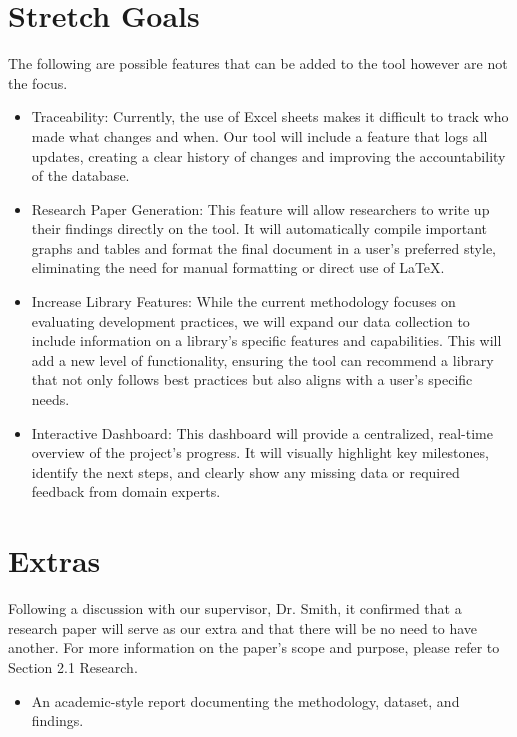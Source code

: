 \documentclass{article}
\begin{document}
\section{Stretch Goals}
The following are possible features that can be added to the tool however are not the focus.
\begin{itemize}
    \item Traceability: Currently, the use of Excel sheets makes it difficult to track who made what changes and when. Our tool will include a feature that logs all updates, creating a clear history of changes and improving the accountability of the database.
    \item Research Paper Generation: This feature will allow researchers to write up their findings directly on the tool. It will automatically compile important graphs and tables and format the final document in a user's preferred style, eliminating the need for manual formatting or direct use of LaTeX.
    \item Increase Library Features: While the current methodology focuses on evaluating development practices, we will expand our data collection to include information on a library's specific features and capabilities. This will add a new level of functionality, ensuring the tool can recommend a library that not only follows best practices but also aligns with a user's specific needs.
    \item Interactive Dashboard: This dashboard will provide a centralized, real-time overview of the project's progress. It will visually highlight key milestones, identify the next steps, and clearly show any missing data or required feedback from domain experts.
\end{itemize}
\section{Extras}
Following a discussion with our supervisor, Dr. Smith, it confirmed that a research paper will serve as our extra and that there will be no need to have another.
For more information on the paper's scope and purpose, please refer to Section 2.1 Research.

\begin{itemize}
  \item An academic-style report documenting the methodology, dataset, and findings.
\end{itemize}
\end{document}
